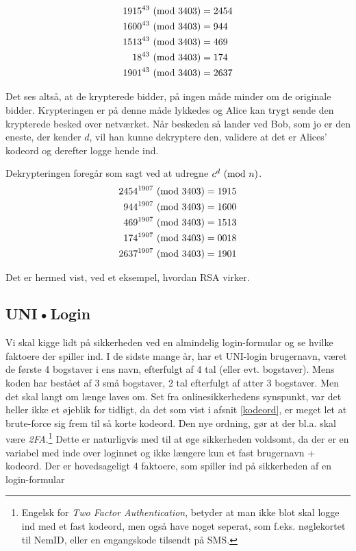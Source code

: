 \begin{eks}
    \begin{align*}
        1915^{43} \ (\mathrm{mod}\ 3403) &= 2454\\
        1600^{43} \ (\mathrm{mod}\ 3403) &= 944\\
        1513^{43} \ (\mathrm{mod}\ 3403) &= 469\\
        18^{43} \ (\mathrm{mod}\ 3403)   &= 174\\
        1901^{43} \ (\mathrm{mod}\ 3403) &= 2637\\
    \end{align*}

    Det ses altså, at de krypterede bidder, på ingen måde minder om de originale bidder.
    Krypteringen er på denne måde lykkedes og Alice kan trygt sende den krypterede besked over netværket.
    Når beskeden så lander ved Bob, som jo er den eneste, der kender \(d\), vil han kunne dekryptere den, validere at det er Alices' kodeord og derefter logge hende ind.

    Dekrypteringen foregår som sagt ved at udregne \(c^d \ (\mathrm{mod}\ n)\).
    \begin{align*}
        2454^{1907} \ (\mathrm{mod}\ 3403) &= 1915\\
        944^{1907} \ (\mathrm{mod}\ 3403)  &= 1600\\
        469^{1907} \ (\mathrm{mod}\ 3403)  &= 1513\\
        174^{1907} \ (\mathrm{mod}\ 3403)  &= 0018\\
        2637^{1907} \ (\mathrm{mod}\ 3403) &= 1901
    \end{align*}

    Det er hermed vist, ved et eksempel, hvordan RSA virker.
\end{eks}



\subsection{UNI•Login}
Vi skal kigge lidt på sikkerheden ved en almindelig login-formular og se hvilke faktoere der spiller ind.
I de sidste mange år, har et UNI-login brugernavn, været de første 4 bogstaver i ens navn, efterfulgt af 4 tal (eller evt. bogstaver).
Mens koden har bestået af 3 små bogstaver, 2 tal efterfulgt af atter 3 bogstaver.
Men det skal langt om længe laves om. \cite{unilogin}
Set fra onlinesikkerhedens synspunkt, var det heller ikke et øjeblik for tidligt, da det som vist i afsnit \ref{kodeord}, er meget let at brute-force sig frem til så korte kodeord.
Den nye ordning, gør at der bl.a. skal være \emph{2FA}.\footnote{Engelsk for \emph{Two Factor Authentication}, betyder at man ikke blot skal logge ind med et fast kodeord, men også have noget seperat, som f.eks. nøglekortet til NemID, eller en engangskode tilsendt på SMS.}
Dette er naturligvis med til at øge sikkerheden voldsomt, da der er en variabel med inde over loginnet og ikke længere kun et fast brugernavn + kodeord.
Der er hovedsageligt 4 faktoere, som spiller ind på sikkerheden af en login-formular

